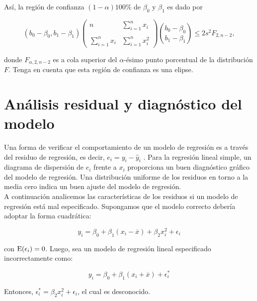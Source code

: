 Así, la región de confianza $(1-\alpha)100\%$ de $\beta_0$ y $\beta_1$ es dado por

\begin{tcolorbox}
$$
\left(b_0-\beta_0,b_1-\beta_1\right)
\left(
    \begin{array}{cc}
	n & \displaystyle\sum_{i=1}^n x_i\\\\
	\displaystyle\sum_{i=1}^n x_i & \displaystyle\sum_{i=1}^n x_i^2
    \end{array}
\right)
{b_0-\beta_0\choose b_1-\beta_1}
\leq 2s^2F_{2,n-2},
$$
\end{tcolorbox}

donde $F_{\alpha,2,n-2}$ es a cola superior del $\alpha$-ésimo punto porcentual de la distribución $F$. Tenga en cuenta que esta región de confianza es una elipse.


\section{Análisis residual y diagnóstico del modelo}
Una forma de verificar el comportamiento de un modelo de regresión es a través del residuo de regresión, es decir, $e_i = y_i - \hat{y}_i$ . Para la regresión lineal simple, un diagrama de dispersión de $e_i$ frente a $x_i$ proporciona un buen diagnóstico gráfico del modelo de regresión. Una distribución uniforme de los residuos en torno a la media cero indica un buen ajuste del modelo de regresión.\\

A continuación analicemos las características de los residuos si un modelo de regresión está mal especificado. Supongamos que el modelo correcto debería adoptar la forma cuadrática:

$$y_i=\beta_0+\beta_1\left(x_i-\overline{x}\right)+\beta_2x_i^2+\epsilon_i$$

con $\mathop{\mbox{\normalfont E}}\nolimits(\epsilon_i)=0$.  Luego, sea un modelo de regresión lineal especificado incorrectamente como:

$$y_i=\beta_0+\beta_1\left(x_i+\overline{x}\right)+\epsilon_i^*$$

Entonces, $\epsilon_i^* = \beta_2x_i^2+\epsilon_i$, el cual es desconocido.
